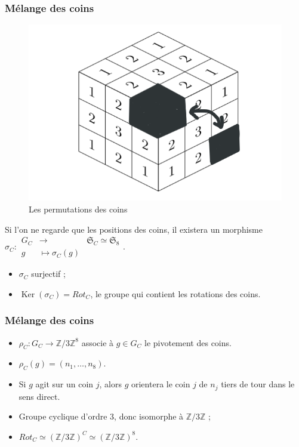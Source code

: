 \documentclass[10pt,notheorems]{beamer}
\theoremstyle{plain}
\theoremstyle{definition}
\theoremstyle{plain}
\theoremstyle{plain}
\theoremstyle{plain}
\theoremstyle{remark}
\begin{document}
\begin{frame}
  \frametitle{Mélange des coins}
  \begin{figure}
    \centering
    \includegraphics[scale=0.2]{figures/coin-permutations.png}
    \caption{Les permutations des coins}
    \label{coin-permutations}
  \end{figure}

  Si l'on ne regarde que les positions des coins, il existera un morphisme $\sigma_C :
    \begin{array}{ccc}
    G_C & \longrightarrow & \mathfrak{S}_{C} \simeq \mathfrak{S}_{8}   \\
    g & \longmapsto \sigma_C(g)
    \end{array}$.

  \begin{itemize}
    \item $\sigma_C $ surjectif ;
    \item $\operatorname{Ker}(\sigma_C) = Rot_C$, le groupe qui contient les rotations des coins.
  \end{itemize}
\end{frame}

\begin{frame}
  \frametitle{Mélange des coins}

  \begin{itemize}
    \item $\rho_C : G_C \to \mathbb{Z}/{ 3 }\mathbb{Z} ^{8}$ associe à $g \in G_C$ le pivotement des coins.
    \item $\rho_C(g) = (n_1, \dots, n_8)$.
    \item Si $g$ agit sur un coin $j$, alors $g$ orientera le coin $j$ de $n_j$ tiers de tour dans le sens direct.
    \item Groupe cyclique d'ordre 3, donc isomorphe à $\mathbb{Z}/{ 3 }\mathbb{Z}$ ;
    \item $Rot_C \simeq (\mathbb{Z}/{ 3 }\mathbb{Z}) ^{C} \simeq (\mathbb{Z}/{ 3 }\mathbb{Z}) ^{8}$.
  \end{itemize}
\end{frame}
\end{document}
